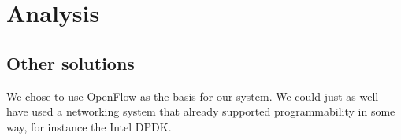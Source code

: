\chapter{Analysis}

\section{Other solutions}

We chose to use OpenFlow as the basis for our system.
We could just as well have used a networking system that already supported
programmability in some way, for instance the Intel DPDK.

